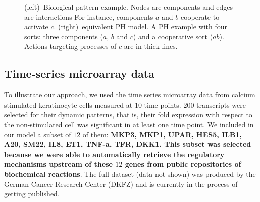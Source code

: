 \documentclass[11pt,a4paper,twoside]{epig}
\begin{document}
\begin{example}
\begin{figure}[ht]
\begin{minipage}{0.6\linewidth}
{
}
\end{minipage}

\caption{\label{fig:modelingBRN}
(left)~Biological pattern example.
Nodes are components and edges are interactions
For instance, components $a$ and $b$ cooperate to activate $c$.
(right)~equivalent PH model. \label{fig:runningPH}
A PH example with four sorts: three components ($a$, $b$ and $c$) and a cooperative sort ($ab$).
Actions targeting processes of $c$ are in thick lines.
}
\end{figure}

\end{example}


\subsection{Time-series microarray data}

To illustrate our approach, we used the time series microarray data from calcium stimulated keratinocyte cells 
 measured at 10 time-points. $200$ transcripts were selected for their dynamic patterns,
that is, their fold expression with respect to the non-stimulated cell was significant in at least one time point. 
We included in our model a subset of $12$ of them: \textbf{MKP3, MKP1, UPAR, HES5, ILB1, A20, SM22, IL8, ET1, TNF-a, TFR, DKK1.
This subset was selected because we were able to automatically retrieve the regulatory mechanisms upstream of these $12$ genes from public repositories of biochemical reactions}.
The full dataset (data not shown) was produced by the German Cancer Research Center (DKFZ) and is currently in the process
of getting published. 
\end{document}
